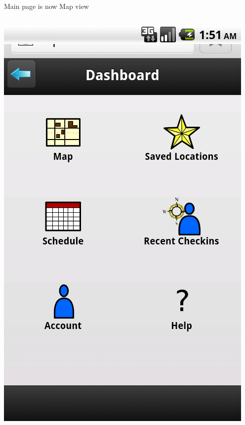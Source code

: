 \documentclass{beamer}
\begin{document}
\begin{frame}{Main page is now Map view}
    \begin{columns}[c]
        \center\includegraphics[height=0.5 \textheight]{pre-heuristic/dashboard.png}

\end{columns}
\end{frame}
\end{document}
